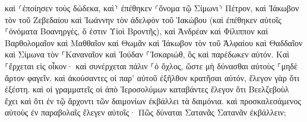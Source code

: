 \documentclass{openreader}
\begin{document}
καὶ ⸂ἐποίησεν τοὺς δώδεκα, καὶ⸃ ἐπέθηκεν ⸂ὄνομα τῷ Σίμωνι⸃ Πέτρον, 
καὶ Ἰάκωβον τὸν τοῦ Ζεβεδαίου καὶ Ἰωάννην τὸν ἀδελφὸν τοῦ Ἰακώβου (καὶ ἐπέθηκεν αὐτοῖς ⸀ὀνόματα Βοανηργές, ὅ ἐστιν Υἱοὶ Βροντῆς), 
καὶ Ἀνδρέαν καὶ Φίλιππον καὶ Βαρθολομαῖον καὶ Μαθθαῖον καὶ Θωμᾶν καὶ Ἰάκωβον τὸν τοῦ Ἁλφαίου καὶ Θαδδαῖον καὶ Σίμωνα τὸν ⸀Καναναῖον 
καὶ Ἰούδαν ⸀Ἰσκαριώθ, ὃς καὶ παρέδωκεν αὐτόν. 
Καὶ ⸀ἔρχεται εἰς οἶκον· καὶ συνέρχεται πάλιν ⸀ὁ ὄχλος, ὥστε μὴ δύνασθαι αὐτοὺς ⸀μηδὲ ἄρτον φαγεῖν. 
καὶ ἀκούσαντες οἱ παρ’ αὐτοῦ ἐξῆλθον κρατῆσαι αὐτόν, ἔλεγον γὰρ ὅτι ἐξέστη. 
καὶ οἱ γραμματεῖς οἱ ἀπὸ Ἱεροσολύμων καταβάντες ἔλεγον ὅτι Βεελζεβοὺλ ἔχει καὶ ὅτι ἐν τῷ ἄρχοντι τῶν δαιμονίων ἐκβάλλει τὰ δαιμόνια. 
καὶ προσκαλεσάμενος αὐτοὺς ἐν παραβολαῖς ἔλεγεν αὐτοῖς· Πῶς δύναται Σατανᾶς Σατανᾶν ἐκβάλλειν; 
\end{document}

